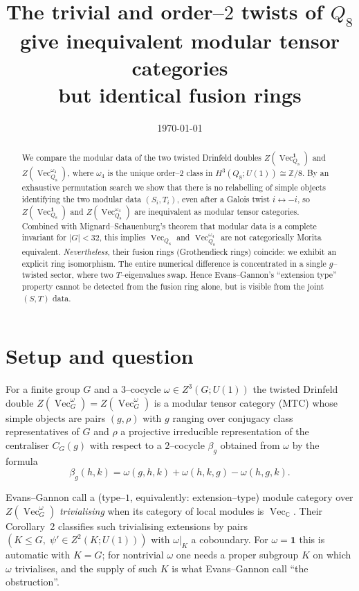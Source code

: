 \documentclass[11pt,a4paper]{amsart}
\title{The trivial and order--$2$ twists of $Q_8$\\
       give inequivalent modular tensor categories\\
       but identical fusion rings}
\author{}
\date{\today}
\theoremstyle{plain}
\theoremstyle{definition}
\DeclareMathOperator{\Vec}{Vec}
\newcommand{\Drinfeld}[2]{Z\!\left(\Vec_{#1}^{#2}\right)}
\newcommand{\trivcoc}{\mathbf{1}}
\begin{document}
\maketitle

\begin{abstract}
We compare the modular data of the two twisted Drinfeld doubles
$\Drinfeld{Q_8}{\trivcoc}$ and $\Drinfeld{Q_8}{\omega_4}$, where
$\omega_4$ is the unique order--$2$ class in
$H^3(Q_8;U(1))\cong\mathbb Z/8$. By an exhaustive permutation search we
show that there is no relabelling of simple objects identifying the two
modular data $(S_i,T_i)$, even after a Galois twist $i\leftrightarrow -i$,
so $\Drinfeld{Q_8}{\trivcoc}$ and $\Drinfeld{Q_8}{\omega_4}$ are
inequivalent as modular tensor categories. Combined with
Mignard--Schauenburg's theorem that modular data is a complete invariant
for $|G|<32$, this implies $\Vec_{Q_8}$ and $\Vec_{Q_8}^{\omega_4}$ are
not categorically Morita equivalent. \emph{Nevertheless}, their fusion
rings (Grothendieck rings) coincide: we exhibit an explicit ring
isomorphism. The entire numerical difference is concentrated in a single
$g$--twisted sector, where two $T$--eigenvalues swap. Hence Evans--Gannon's
``extension type'' property cannot be detected from the fusion ring
alone, but is visible from the joint $(S,T)$ data.
\end{abstract}

\section{Setup and question}

For a finite group $G$ and a $3$--cocycle
$\omega\in Z^3(G;U(1))$ the twisted Drinfeld double
$\Drinfeld{G}{\omega}=Z(\Vec_G^\omega)$ is a modular tensor category
(MTC) whose simple objects are pairs $(g,\rho)$ with $g$ ranging over
conjugacy class representatives of $G$ and $\rho$ a projective
irreducible representation of the centraliser $C_G(g)$ with respect to a
$2$--cocycle $\beta_g$ obtained from $\omega$
by the formula
\begin{equation}
\beta_g(h,k) = \omega(g,h,k) + \omega(h,k,g) - \omega(h,g,k).
\label{eq:beta}
\end{equation}

Evans--Gannon \cite{EvansGannon} call a (type--$1$, equivalently:
extension--type) module category over $\Drinfeld{G}{\omega}$
\emph{trivialising} when its category of local modules is
$\Vec_{\mathbb C}$. Their Corollary~2 classifies such trivialising
extensions by pairs $(K\le G,\;\psi'\in Z^2(K;U(1)))$ with
$\omega|_K$ a coboundary. For $\omega=\trivcoc$ this is automatic with
$K=G$; for nontrivial $\omega$ one needs a proper subgroup $K$ on which
$\omega$ trivialises, and the supply of such $K$ is what
Evans--Gannon call ``the obstruction''.
\end{document}

